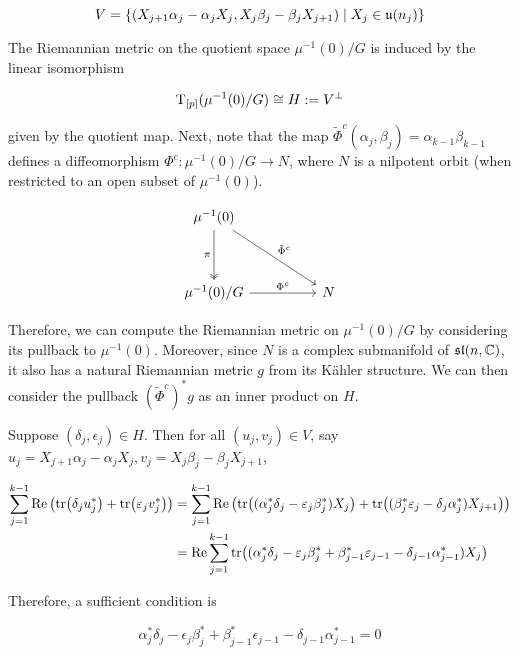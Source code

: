\documentclass{article}
\renewcommand{\sl}{\mathfrak{sl}}
\begin{document}
\[V = \left\{(X_{j+1}\alpha_j - \alpha_jX_j, X_j\beta_j - \beta_jX_{j+1}) \mid X_j \in \mathfrak{u}(n_j)\right\}\]

The Riemannian metric on the quotient space \(\mu^{-1}(0)/G\) is induced by the linear isomorphism

\[\mathrm{T}_{[p]}(\mu^{-1}(0)/G) \cong H := V^\perp\]

given by the quotient map. Next, note that the map \(\tilde\Phi^c(\alpha_j, \beta_j) = \alpha_{k-1}\beta_{k-1}\) defines a diffeomorphism \(\Phi^c : \mu^{-1}(0)/G \to N\), where \(N\) is a nilpotent orbit (when restricted to an open subset of \(\mu^{-1}(0)\)).

\[\begin{tikzcd}
	{\mu^{-1}(0)} \\
	\\
	{\mu^{-1}(0)/G} && N
	\arrow["\pi"', two heads, from=1-1, to=3-1]
	\arrow["{\Phi^c}", from=3-1, to=3-3]
	\arrow["{\tilde\Phi^c}", from=1-1, to=3-3]
\end{tikzcd}\]

Therefore, we can compute the Riemannian metric on \(\mu^{-1}(0)/G\) by considering its pullback to \(\mu^{-1}(0)\). Moreover, since \(N\) is a complex submanifold of \(\sl(n, \C)\), it also has a natural Riemannian metric \(g\) from its K\"ahler structure. We can then consider the pullback \((\tilde\Phi^c)^*g\) as an inner product on \(H\).

Suppose \((\delta_j, \epsilon_j) \in H\). Then for all \((u_j, v_j) \in V\), say \(u_j = X_{j+1}\alpha_j - \alpha_jX_j, v_j = X_j\beta_j - \beta_jX_{j+1}\),

\begin{align*}
    \sum_{j=1}^{k-1}\Re\left(\tr(\delta_j u_j^*) + \tr(\varepsilon_jv_j^*)\right) &= \sum_{j=1}^{k-1}\Re\left(\tr((\alpha_j^*\delta_j - \varepsilon_j\beta_j^*)X_j) + \tr((\beta_j^*\varepsilon_j - \delta_j\alpha_j^*)X_{j+1})\right) \\
    &= \Re\sum_{j=1}^{k-1}\tr((\alpha_j^*\delta_j - \varepsilon_j\beta_j^* + \beta_{j-1}^*\varepsilon_{j-1} - \delta_{j-1}\alpha_{j-1}^*)X_j)
\end{align*}

Therefore, a sufficient condition is

\[\alpha_j^*\delta_j - \epsilon_j\beta_j^* + \beta_{j-1}^*\epsilon_{j-1} - \delta_{j-1}\alpha_{j-1}^* = 0\]
\end{document}
